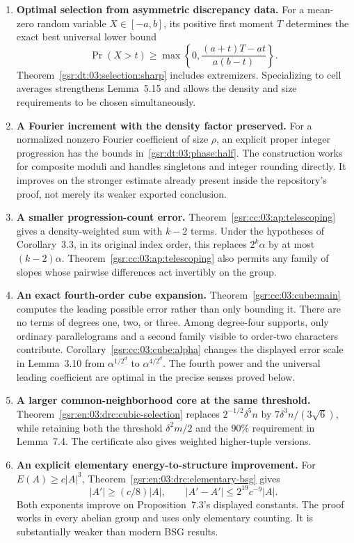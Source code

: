 \documentclass[11pt,letterpaper]{article}
\numberwithin{equation}{section}
\theoremstyle{definition}
\theoremstyle{remark}
\newcommand{\1}{\mathbf 1}
\begin{document}
\begin{enumerate}
\item \textbf{Optimal selection from asymmetric discrepancy data.}
For a mean-zero random variable $X\in[-a,b]$, its positive first moment
$T$ determines the exact best universal lower bound
\[
 \Pr(X>t)\ge\max\left\{0,\frac{(a+t)T-at}{a(b-t)}\right\}.
\]
Theorem~\ref{gsr:dt:03:selection:sharp} includes extremizers. Specializing to cell
averages strengthens Lemma~5.15 and allows the density and size
requirements to be chosen simultaneously.

\item \textbf{A Fourier increment with the density factor preserved.}
For a normalized nonzero Fourier coefficient of size $\rho$, an explicit
proper integer progression has the bounds in~\eqref{gsr:dt:03:phase:half}. The
construction works for composite moduli and handles singletons and
integer rounding directly. It improves on the stronger estimate already
present inside the repository's proof, not merely its weaker exported
conclusion.

\item \textbf{A smaller progression-count error.}
Theorem~\ref{gsr:cc:03:ap:telescoping} gives a density-weighted sum with $k-2$ terms.
Under the hypotheses of Corollary~3.3, in its original index order, this
replaces $2^k\alpha$ by at most $(k-2)\alpha$.
Theorem~\ref{gsr:cc:03:ap:telescoping} also permits any family of slopes whose
pairwise differences act invertibly on the group.

\item \textbf{An exact fourth-order cube expansion.}
Theorem~\ref{gsr:cc:03:cube:main} computes the leading possible error rather than
only bounding it. There are no terms of degrees one, two, or three.
Among degree-four supports, only ordinary parallelograms and a second
family visible to order-two characters contribute. Corollary~\ref{gsr:cc:03:cube:alpha}
changes the displayed error scale in Lemma~3.10 from
$\alpha^{1/2^d}$ to $\alpha^{4/2^d}$. The fourth power and the universal
leading coefficient are optimal in the precise senses proved below.

\item \textbf{A larger common-neighborhood core at the same threshold.}
Theorem~\ref{gsr:en:03:drc:cubic-selection} replaces
$2^{-1/2}\delta^5n$ by $7\delta^3n/(3\sqrt6)$, while retaining both
the threshold $\delta^2m/2$ and the $90\%$ requirement in Lemma~7.4.
The certificate also gives weighted higher-tuple versions.

\item \textbf{An explicit elementary energy-to-structure improvement.}
For $E(A)\ge c|A|^3$, Theorem~\ref{gsr:en:03:drc:elementary-bsg} gives
\[
 |A'|\ge(c/8)|A|,\qquad
 |A'-A'|\le2^{19}c^{-9}|A|.
\]
Both exponents improve on Proposition~7.3's displayed constants.
The proof works in every abelian group and uses only elementary
counting. It is substantially weaker than modern BSG results.
\end{enumerate}
\end{document}
